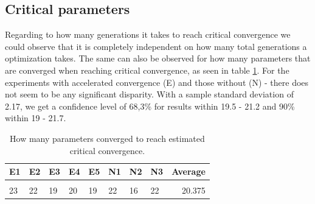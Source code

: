 \documentclass[a4paper,english]{report}
\begin{document}
	\subsection{Critical parameters}
	Regarding to how many generations it takes to reach critical convergence we could observe that it is completely independent on how many total generations a optimization takes. The same can also be observed for how many parameters that are converged when reaching critical convergence, as seen in table \ref{table:criticalparams}. For the experiments with accelerated convergence (E) and those without (N) - there does not seem to be any significant disparity. With a sample standard deviation of 2.17, we get a confidence level of 68,3\% for results within 19.5 - 21.2 and 90\% within 19 - 21.7.
	\begin{table}[H]
		\centering
		\caption{How many parameters converged to reach estimated critical convergence.}
		\label{table:criticalparams}
		\begin{tabular}{llllllll|r}
			\\
			\textbf{E1} & \textbf{E2} & \textbf{E3} & \textbf{E4} & \textbf{E5} & \textbf{N1} & \textbf{N2} & \textbf{N3} & \textbf{Average} \\ \hline \\
			23 & 22 & 19 & 20 & 19 & 22 & 16 & 22 & 20.375 \\
		\end{tabular}
	\end{table}
	\clearpage
\end{document}
